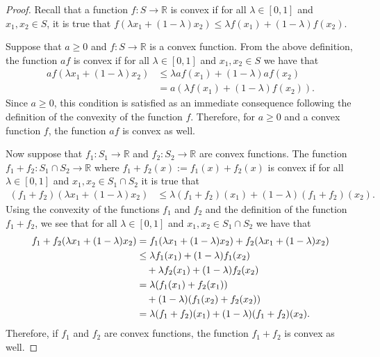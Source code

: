 \documentclass[12pt]{article}
\theoremstyle{definition}
\begin{document}
\begin{proof}
  Recall that a function $f:S \to \mathbb{R}$ is convex if for all $\lambda \in [0, 1]$
  and $x_1, x_2 \in S$, it is true that $f(\lambda x_1 + (1-\lambda)x_2) \leq \lambda f(x_1) + (1-\lambda)f(x_2)$.

  Suppose that $a \geq 0$ and $f:S \to \mathbb{R}$ is a convex function. From the above definition, the function
  $af$ is convex if for all $\lambda \in [0, 1]$
  and $x_1, x_2 \in S$ we have that
  \begin{align*}
    af(\lambda x_1 + (1-\lambda)x_2)
    &\leq \lambda af(x_1) + (1-\lambda)af(x_2) \\
    &= a(\lambda f(x_1) + (1-\lambda)f(x_2)).
  \end{align*}
  Since $a \geq 0$, this condition is satisfied as an immediate consequence
  following the definition of the convexity of the function $f$. Therefore, for
  $a \geq 0$ and a convex function $f$, the function $af$ is convex as well.

  Now suppose that $f_1:S_1 \to \mathbb{R}$ and $f_2:S_2 \to \mathbb{R}$ are convex
  functions.
  The function $f_1 + f_2: S_1 \cap S_2 \to \mathbb{R}$ where $f_1 + f_2(x) := f_1(x) + f_2(x)$
  is convex if for all $\lambda \in [0, 1]$ and $x_1, x_2 \in S_1 \cap S_2$
  it is true that
  \begin{align*}
    (f_1 + f_2)(\lambda x_1 + (1-\lambda)x_2)
    &\leq \lambda (f_1 + f_2)(x_1) + (1-\lambda)(f_1 + f_2)(x_2).
  \end{align*}
  Using the convexity of the functions $f_1$ and $f_2$ and the definition of the function
  $f_1 + f_2$, we see that for all $\lambda \in [0, 1]$ and $x_1, x_2 \in S_1 \cap S_2$ we have that
  \begin{align*}
    f_1 + f_2(\lambda x_1 + (1-\lambda)x_2)
    &= f_1(\lambda x_1 + (1-\lambda)x_2) + f_2(\lambda x_1 + (1-\lambda)x_2) \notag \\
    &\leq \lambda f_1(x_1) + (1-\lambda)f_1(x_2) \notag \\
    &\quad + \lambda f_2(x_1) + (1-\lambda)f_2(x_2) \notag \\
    &= \lambda (f_1(x_1) + f_2(x_1)) \notag \\
    &\quad + (1 - \lambda)(f_1(x_2) + f_2(x_2)) \notag \\
    &= \lambda (f_1 + f_2)(x_1) + (1 - \lambda) (f_1 + f_2)(x_2).
  \end{align*}
  Therefore, if $f_1$ and $f_2$ are convex functions, the function $f_1 + f_2$
  is convex as well.
\end{proof}
\newpage
\end{document}
